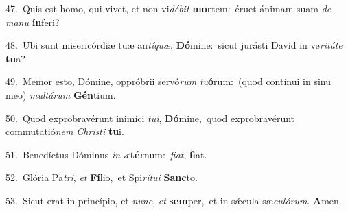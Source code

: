 {\numbfont\textcolor{\numbcolor}{47.}}~Quis est homo, qui vivet, et non vi\-\textit{dé}\-\textit{bit} \textbf{mor}\-tem:~\star éruet ánimam suam \textit{de} \textit{ma}\-\textit{nu} \textbf{ín}\-feri?\par
{\numbfont\textcolor{\numbcolor}{48.}}~Ubi sunt misericórdiæ tuæ an\-\textit{tí}\-\textit{quæ}, \textbf{Dó}\-mine:~\star sicut jurásti David in ve\-\textit{ri}\-\textit{tá}\textit{te} \textbf{tu}\-a?\par
{\numbfont\textcolor{\numbcolor}{49.}}~Memor esto, Dómine, oppróbrii servó\textit{rum} \textit{tu}\-\textbf{ó}rum:~\star (quod contínui in sinu meo) \textit{mul}\-\textit{tá}\textit{rum} \textbf{Gén}\-tium.\par
{\numbfont\textcolor{\numbcolor}{50.}}~Quod exprobravérunt inimíci \textit{tu}\-\textit{i}, \textbf{Dó}\-mine,~\star quod exprobravérunt commutatió\textit{nem} \textit{Chris}\-\textit{ti} \textbf{tu}\-i.\par
{\numbfont\textcolor{\numbcolor}{51.}}~Benedíctus Dóminus \textit{in} \textit{æ}\-\textbf{tér}num:~\star \textit{fi}\-\textit{at}, \textbf{fi}\-at.\par
{\numbfont\textcolor{\numbcolor}{52.}}~Glória Pa\-\textit{tri}\-, \textit{et} \textbf{Fí}\-lio,~\star et Spi\-\textit{rí}\-\textit{tu}\textit{i} \textbf{Sanc}\-to.\par
{\numbfont\textcolor{\numbcolor}{53.}}~Sicut erat in princípio, et \textit{nunc}\-, \textit{et} \textbf{sem}\-per,~\star et in sǽcula sæ\-\textit{cu}\-\textit{ló}\textit{rum}. \textbf{A}\-men.\par
